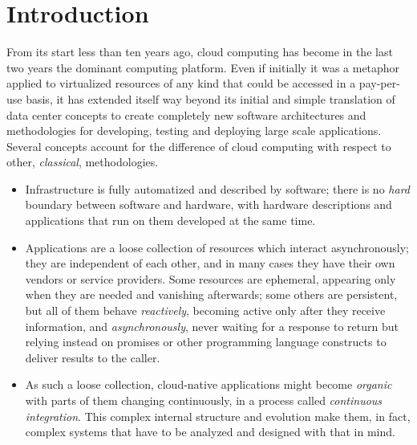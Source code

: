 \documentclass[utf8]{frontiersSCNS} %
\begin{document}
\section{Introduction}

From its start less than ten years ago, cloud computing
\citep{qian2009cloud,armbrust2010view,Sadiku2014} has become in the last two
years the dominant computing platform. Even if initially it was a
metaphor applied to virtualized resources of any kind that could be
accessed in a pay-per-use basis, it has extended itself way beyond its
initial and simple translation of data center concepts to create
completely new software architectures and methodologies for
developing, testing and deploying large scale applications. Several
concepts account for the difference of cloud computing with respect
to other, {\em classical}, methodologies. %


\begin{itemize}

\item Infrastructure is fully automatized and described by software;
  there is no {\em hard} boundary between software and hardware, with
  hardware descriptions and applications that run on them
  developed at the same time.

\item Applications are a loose collection of resources which interact
  asynchronously; they are independent of each other, and in many cases
  they have their own vendors or service providers. Some resources are
  ephemeral, appearing only when they are needed and vanishing afterwards;
  some others are persistent, but all of them behave {\em reactively},
  becoming active only after 
  they receive information, and {\em asynchronously}, never waiting for a
  response to return but relying instead on promises or other
  programming language constructs to deliver results to the caller.

\item  As such a loose collection, cloud-native applications might
  become {\em organic} with parts of them changing continuously, in a
  process called {\em continuous integration}. This complex internal
  structure and evolution make them, in fact, complex systems that
  have to be analyzed and designed with that in mind.
\end{itemize}
\end{document}
